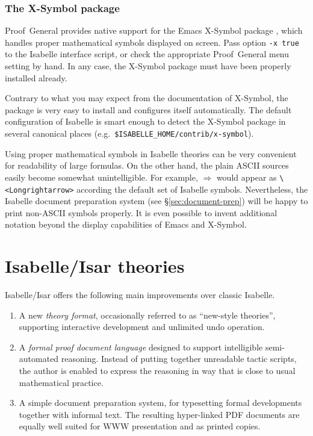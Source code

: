 \subsubsection{The X-Symbol package}

Proof~General provides native support for the Emacs X-Symbol package
\cite{x-symbol}, which handles proper mathematical symbols displayed on
screen.  Pass option \texttt{-x true} to the Isabelle interface script, or
check the appropriate Proof~General menu setting by hand.  In any case, the
X-Symbol package must have been properly installed already.

Contrary to what you may expect from the documentation of X-Symbol, the
package is very easy to install and configures itself automatically.  The
default configuration of Isabelle is smart enough to detect the X-Symbol
package in several canonical places (e.g.\ 
\texttt{\$ISABELLE_HOME/contrib/x-symbol}).

\medskip

Using proper mathematical symbols in Isabelle theories can be very convenient
for readability of large formulas.  On the other hand, the plain ASCII sources
easily become somewhat unintelligible.  For example, $\Longrightarrow$ would
appear as \verb,\<Longrightarrow>, according the default set of Isabelle
symbols.  Nevertheless, the Isabelle document preparation system (see
\S\ref{sec:document-prep}) will be happy to print non-ASCII symbols properly.
It is even possible to invent additional notation beyond the display
capabilities of Emacs and X-Symbol.


\section{Isabelle/Isar theories}

Isabelle/Isar offers the following main improvements over classic Isabelle.
\begin{enumerate}
\item A new \emph{theory format}, occasionally referred to as ``new-style
  theories'', supporting interactive development and unlimited undo operation.
\item A \emph{formal proof document language} designed to support intelligible
  semi-automated reasoning.  Instead of putting together unreadable tactic
  scripts, the author is enabled to express the reasoning in way that is close
  to usual mathematical practice.
\item A simple document preparation system, for typesetting formal
  developments together with informal text.  The resulting hyper-linked PDF
  documents are equally well suited for WWW presentation and as printed
  copies.
\end{enumerate}

